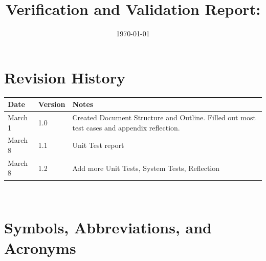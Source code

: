 \documentclass[12pt, titlepage]{article}
\begin{document}
\title{Verification and Validation Report: \progname} 
\author{\authname}
\date{\today}
	
\maketitle


\section{Revision History}

\begin{tabularx}{\textwidth}{p{3cm}p{2cm}X}
  \toprule {\bf Date} & {\bf Version} & {\bf Notes}\\
  \midrule
  March 1 & 1.0 & Created Document Structure and Outline. Filled out most test cases and appendix reflection. \\
  March 8 & 1.1 & Unit Test report\\
  March 8 & 1.2 & Add more Unit Tests, System Tests, Reflection\\
  \bottomrule
  \end{tabularx}

~\newpage

\section{Symbols, Abbreviations, and Acronyms}
\end{document}
